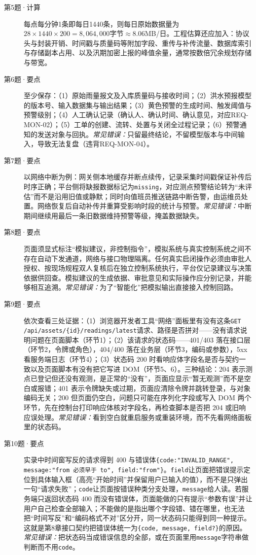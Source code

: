 \begin{description}
\item[第5题·计算] 每点每分钟1条即每日1440条，则每日原始数据量为$28\times1440\times200=8{,}064{,}000$字节$\approx8.06$MB/日。工程估算还应加入：协议头与封装开销、时间戳与质量码等附加字段、重传与补传流量、数据库索引与存储副本占用、以及汛期加密上报的峰值余量，通常按数倍冗余规划存储与带宽。
\item[第6题·要点] 至少保存：（1）原始雨量报文及入库质量码与接收时间；（2）洪水预报模型的版本号、输入数据集与输出结果；（3）黄色预警的生成时间、触发阈值与预警级别；（4）人工确认记录（确认人、确认时间、确认意见，对应REQ-MON-02）；（5）工单的创建、流转、处置与关闭全过程记录；（6）预警通知的发送对象与回执。\textit{常见错误：}只留最终结论，不留模型版本与中间输入，导致无法复盘（违背REQ-MON-04）。
\item[第7题·要点] 以网络中断为例：网关侧本地缓存并断点续传，记录采集时间戳保证补传后时序正确；平台侧将缺报数据标记为\texttt{missing}，对应测点预警结论转为“未评估”而不是沿用旧值或静默；同时向值班员推送链路中断告警，由运维员处置。网络恢复后自动补传并重算受影响时段的统计与预警。\textit{常见错误：}中断期间继续用最后一条旧数据维持预警等级，掩盖数据缺失。
\item[第8题·要点] 页面须显式标注“模拟建议，非控制指令”，模拟系统与真实控制系统之间不存在自动下发通道，网络与接口物理隔离。任何真实启闭操作必须由审批人授权、按现场规程双人复核后在独立控制系统执行，平台仅记录建议与决策依据供回查。模拟建议的生成依据、审批意见和实际操作应分别记录，并能够相互追溯。\textit{常见错误：}为了“智能化”把模拟输出直接接入控制回路。
\item[第9题·要点] 依次查看三处证据：（1）浏览器开发者工具“网络”面板里有没有这条\texttt{GET /api/assets/\{id\}/readings/latest}请求、路径是否拼对——没有请求说明问题在页面脚本（环节1）；（2）该请求的状态码——401/403 落在接口层（环节2，令牌或角色），404/400 落在业务层（环节3，编码或参数），5xx 看服务端日志（环节4）；（3）状态码 200 时看响应体字段名是否与契约一致以及页面脚本有没有把它写进 DOM（环节5、6）。三种结论：204 表示测点已登记但还没有观测，是正常的“没有”，页面应显示“暂无观测”而不是空白或报错；401 表示令牌缺失或过期，页面应清除令牌并跳转登录，与对象编码无关；200 但页面仍空白，问题只可能在序列化字段或写入 DOM 两个环节，先在控制台打印响应体核对字段名，再检查脚本是否把 204 或旧响应误处理。\textit{常见错误：}看到空白就重启服务或重装环境，而不先看网络面板里的状态码。
\item[第10题·要点] 实录中时间窗写反的请求得到 400 与错误体\texttt{\{code:"INVALID\_RANGE", message:"from 必须早于 to", field:"from"\}}。\texttt{field}让页面把错误提示定位到具体输入框（高亮“开始时间”并保留用户已输入的值），而不是只弹出一句“请求失败”；\texttt{code}让页面按错误种类分支处理，\texttt{message}给人读。若服务端只返回状态码 400 而没有错误体，页面能做的只有提示“参数有误”并让用户自己检查全部输入；不能做的是指出哪个字段错、错在哪里，也无法把“时间写反”和“编码格式不对”区分开，同一状态码只能得到同一种提示。这就是第8章接口契约把错误体统一为\texttt{\{code, message, field?\}}的原因。\textit{常见错误：}把状态码当成错误信息的全部，或在页面里用\texttt{message}字符串做判断而不用\texttt{code}。
\end{description}

